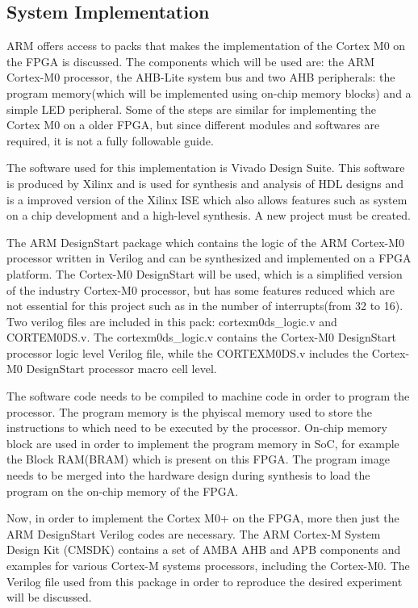 \subsection{System Implementation}

ARM offers access to packs that makes the implementation of the Cortex M0 on the FPGA is discussed. The components which will be used are: the ARM Cortex-M0 processor, the AHB-Lite system bus and two AHB peripherals: the program memory(which will be implemented using on-chip memory blocks) and a simple LED peripheral. Some of the steps are similar for implementing the Cortex M0 on a older FPGA, but since different modules and softwares are required, it is not a fully followable guide.

The software used for this implementation is Vivado Design Suite. This software is produced by Xilinx and is used for synthesis and analysis of HDL designs and is a improved version of the Xilinx ISE which also allows features such as system on a chip development and a high-level synthesis. A new project must be created.

The ARM DesignStart  package which contains the logic of the ARM Cortex-M0 processor written in Verilog and can be synthesized and implemented on a FPGA platform. The Cortex-M0 DesignStart will be used, which is a simplified version of the industry Cortex-M0 processor, but has some features reduced which are not essential for this project such as in the number of interrupts(from 32 to 16). Two verilog files are included in this pack:  cortexm0ds\_logic.v and CORTEM0DS.v. The cortexm0ds\_logic.v contains the Cortex-M0 DesignStart processor logic level Verilog file, while the CORTEXM0DS.v includes the Cortex-M0 DesignStart processor macro cell level.

The software code needs to be compiled to machine code in order to program the processor. The program memory is the phyiscal memory used to store the instructions to which need to be executed by the processor. On-chip memory block are used in order to implement the program memory in SoC, for example the Block RAM(BRAM) which is present on this FPGA. The program image needs to be merged into the hardware design during synthesis to load the program on the on-chip memory of the FPGA.

Now, in order to implement the Cortex M0+ on the FPGA, more then just the ARM DesignStart Verilog codes are necessary. The ARM Cortex-M System Design Kit (CMSDK) contains a set of AMBA AHB and APB components and examples for various Cortex-M systems processors, including the Cortex-M0. The  Verilog file  used from this package in order to reproduce the desired experiment will be discussed.


